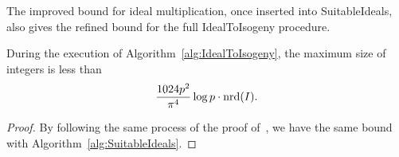 The improved bound for ideal multiplication, once inserted into \textsf{SuitableIdeals}, also gives the refined bound for the full \textsf{IdealToIsogeny} procedure.

\begin{lemma}
\label{lem:IdealToIsogeny-bound}
During the execution of Algorithm~\ref{alg:IdealToIsogeny}, the maximum size of integers is less than \[\frac{1024p^2}{\pi^4}\log{p} \cdot \mathrm{nrd}(I).\]
\end{lemma}

\begin{proof}
By following the same process of the proof of~\cite[Lemma~7]{KLKL25}, we have the same bound with Algorithm~\ref{alg:SuitableIdeals}.
\end{proof}